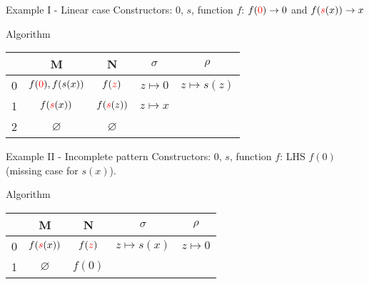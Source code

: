 \begin{frame}{Example I - Linear case}
Constructors: $0$, $s$, function $f$: $f(\textcolor{red}{0}) \rightarrow 0$ and $f(\textcolor{red}{s}(x)) \rightarrow x$

\begin{block}{Algorithm}
\begin{center}
\begin{tabular}{ c || c | c || c | c }
    & M & N & $\sigma$ & $\rho$ \\
    \hline\hline
    0 & $f(\textcolor{red}{0}), f(s(x))$ & $f(\textcolor{red}{z})$ & $z \mapsto 0$ & $z \mapsto s(z)$ \\
    1 & $f(\textcolor{red}{s}(x))$ & $f(\textcolor{red}{s}(z))$ & $z \mapsto x$ & \\
    2 &  $\varnothing$ & $\varnothing$ & & \\
\end{tabular}
\end{center}
\end{block}

\end{frame}

\begin{frame}{Example II - Incomplete pattern}
Constructors: $0$, $s$, function $f$: LHS $f(0)$ (missing case for $s(x)$).

\begin{block}{Algorithm}
\begin{center}
\begin{tabular}{ c || c | c || c | c }
    & M & N & $\sigma$ & $\rho$ \\
    \hline\hline
    0 & $f(\textcolor{red}{s}(x))$ & $f(\textcolor{red}{z})$ & $z \mapsto s(x)$ & $z \mapsto 0$  \\
    1 & $\varnothing$ & $f(0)$ & & \\
\end{tabular}
\end{center}
\end{block}

\end{frame}
